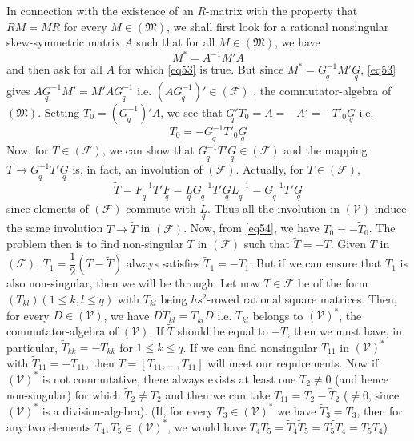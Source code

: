 In connection with the existence of an $R$-matrix with the property
that $RM = MR$ for every $M \in (\mathfrak{M})$, we shall first look
for a rational nonsingular skew-symmetric matrix $A$ such that for all
$M \in (\mathfrak{M})$, we have 
\begin{equation*}
M^{\ast} = A^{-1}M' A \tag{53}\label{eq53}
\end{equation*}\pageoriginale
and then ask for all $A$ for which \eqref{eq53} is true. But since $M^{\ast} =
\underset{q}{G^{-1}}M'\underset{q}{G}$, \eqref{eq53} gives
$A\underset{q}{G}^{-1} M' = M' A \underset{q}{G^{-1}}$
i.e. $(A\underset{q}{G^{-1}})' \in (\mathscr{F})$ , the
commutator-algebra of $(\mathfrak{M})$. Setting $T_0 =
(\underset{q}{G^{-1}})' A$, we see that $\underset{q}{G'} T_0 = A =
-A' = - T'_0 \underset{q}{G}$ i.e. 
\begin{equation*}
T_0 = - \underset{q}{G^{-1}} T'_0 \underset{q}{G} \tag{54}\label{eq54}
\end{equation*}
Now, for $T \in (\mathscr{F})$, we can show that $\underset{q}{G^{-1}}
T' \underset{q}{G} \in (\mathscr{F})$ and the mapping $T \rightarrow
\underset{q}{G^{-1}} T'\underset{q}{G}$ is, in fact, an involution of
$(\mathscr{F})$. Actually, for $T \in (\mathscr{F})$,
$$
\widetilde{T} = \underset{q}{F^{-1}} T' \underset{q}{F} =
\underset{q}{L} \underset{q}{G^{-1}} T' \underset{q}{G}
\underset{q}{L^{-1}} = \underset{q}{G^{-1}} T' \underset{q}{G}
$$
since elements of $(\mathscr{F})$ commute with $\underset{q}{L}$. Thus
all the involution in $(\mathscr{V})$ induce the same involution $T
\rightarrow \widetilde{T}$ in $(\mathscr{F})$. Now, from \eqref{eq54}, we have
$T_0 = - \widetilde{T}_0$. The problem then is to find non-singular
$T$ in $(\mathscr{F})$ such that $\widetilde{T}=-T$. Given $T$ in
$(\mathscr{F})$, $T_1 = \dfrac{1}{2}(T-\widetilde{T})$ always
satisfies $\widetilde{T}_1 = - T_1$. But if we can ensure that $T_1$
is also non-singular, then we will be through. Let now $T \in
\mathscr{F}$ be of the form $(T_{kl})(1\leq k, l\leq q)$ with $T_{kl}$
being $hs^2$-rowed rational square matrices. Then, for every $D \in
(\mathscr{V})$, we have $DT_{kl} = T_{kl}D$ i.e. $T_{kl}$ belongs to
$(\mathscr{V})^{\ast}$, the commutator-algebra of $(\mathscr{V})$. If
$\widetilde{T}$ should be equal to $-T$, then we must have, in
particular, $\widetilde{T}_{kk} = -T_{kk}$ for $1\leq k \leq q$. If we
can find nonsingular $T_{11}$ in $(\mathscr{V})^{\ast}$ with
$\widetilde{T}_{11} = - T_{11}$, then $T = [T_{11},\ldots, T_{11}]$
will meet our requirements. \pageoriginale Now if
$(\mathscr{V})^{\ast}$ is not commutative, there always exists at
least one $T_2 \neq 0$ (and hence non-singular) for which
$\widetilde{T}_2 \neq T_2$ and then we can take $T_{11}= T_2 -
\widetilde{T}_2$ ($\neq 0$, since $(\mathscr{V})^{\ast}$ is a
division-algebra). (If, for every $T_3 \in (\mathscr{V})^{\ast}$ we
have $\widetilde{T}_3 = T_3$, then for any two elements $T_4, T_5 \in
(\mathscr{V})^{\ast}$, we would have $T_4 T_5 = \widetilde{T}_4
\widetilde{T}_5 = \widetilde{T_5 T_4} = T_5 T_4$) 

